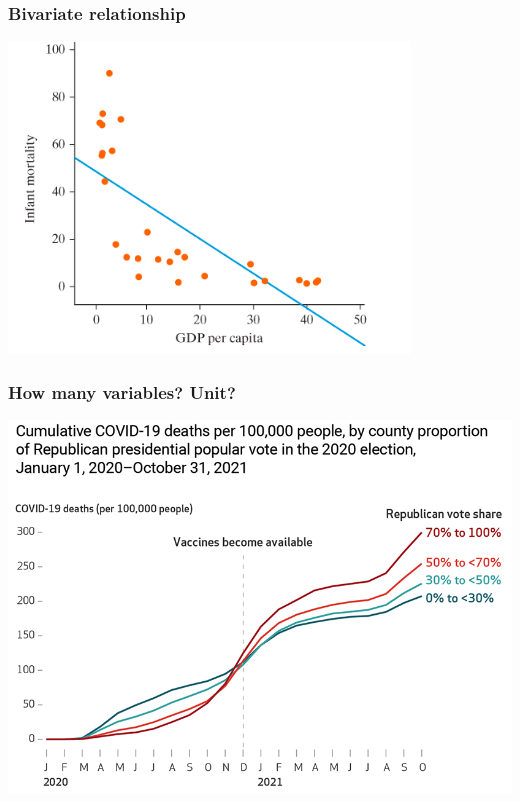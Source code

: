 \documentclass[aspectratio=43]{beamer}
\begin{document}
\begin{frame}
\frametitle{Bivariate relationship}
\centering

\includegraphics[width = 0.8\textwidth]{../img/scatter_GDP_mort}

\end{frame}

\begin{frame}
\frametitle{How many variables? Unit?}
\centering

\includegraphics[width = \textwidth]{../img/covid_vote}

\end{frame}
\end{document}
